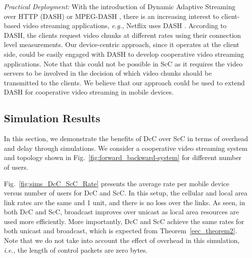 \documentclass[conference]{IEEEtran}
\newcommand{\ie}{{\em i.e., }}
\newcommand{\eg}{{\em e.g., }}
\begin{document}
{\em Practical Deployment:} With the introduction of Dynamic Adaptive Streaming over HTTP (DASH) or MPEG-DASH \cite{dash}, there is an increasing interest to client-based video streaming applications, \eg Netflix uses DASH \cite{netflixdash}. According to DASH, the clients request video chunks at different rates using their connection level measurements. Our device-centric approach, since it operates at the client side, could be easily engaged with DASH to develop cooperative video streaming applications. Note that this could not be possible in ScC as it requires the video servers to be involved in the decision of which video chunks should be transmitted to the clients. We believe that our approach could be used to extend DASH for cooperative video streaming in mobile devices.

\subsection{Simulation Results}
In this section, we demonstrate the benefits of DcC over ScC in terms of overhead and delay through simulations. We consider a cooperative video streaming system and topology shown in Fig.~\ref{fig:forward_backward-system} for different number of users.

Fig.~\ref{fig:sims_DcC_ScC_Rate} presents the average rate per mobile device versus number of users for DcC and ScC. In this setup, the cellular and local area link rates are the same and 1 unit, and there is no loss over the links. As seen, in both DcC and ScC, broadcast improves over unicast as local area resources are used more efficiently. More importantly, DcC and ScC achieve the same rates for both unicast and broadcast, which is expected from Theorem~\ref{eec_theorem2}. Note that we do not take into account the effect of overhead in this simulation, \ie the length of control packets are zero bytes.

\begin{figure*}[t!]
\centering
{}
\vspace{-5pt}
\caption{Average rate per mobile device in unicast and broadcast scenarios for (a) DcC and (b) ScC. (c) Percentage of overhead vs packet size.}
\label{fig:sims_DcC_ScC_Rate}
\end{figure*}
\end{document}
